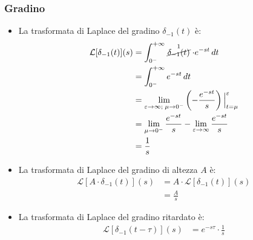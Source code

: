 \documentclass[a4paper]{article}
\begin{document}
\subsubsection{Gradino}

\begin{figure}[H]
  \centering
\end{figure}
\begin{itemize}
  \item 
    La trasformata di Laplace del gradino \( \delta_{-1}(t) \) è:
    \[
      \begin{aligned}
        \mathcal{L}[\delta_{-1}(t)](s) &= \int_{0^-}^{+\infty} \stackrel{1}{\cancel{\delta_{-1}(t)}} \cdot e^{-st} \, dt\\
                                       &= \int_{0^-}^{+\infty} e^{-st} \, dt\\
                                       &= \lim_{\varepsilon \to \infty;\; \mu \to 0^-} \left( - \frac{e^{-st}}{s} \right) \Big|^{\varepsilon}_{t=\mu}\\
                                       &= \lim_{\mu \to 0^-}  \frac{e^{-st}}{s} - \lim_{\varepsilon \to \infty} \frac{e^{-st}}{s}\\
                                       &= \frac{1}{s}
      \end{aligned}
    \] 

  \item 
    La trasformata di Laplace del gradino di altezza \( A \) è:
    \[
      \begin{aligned}
        \mathcal{L}[A \cdot \delta_{-1}(t)](s) &= A \cdot \mathcal{L}[\delta_{-1}(t)](s)\\
                                               &= \frac{A}{s}
      \end{aligned}
    \]
  \item 
    La trasformata di Laplace del gradino ritardato è:
    \[
      \begin{aligned}
        \mathcal{L}[\delta_{-1}(t - \tau)](s) &= e^{-s \tau} \cdot \frac{1}{s}
      \end{aligned}
    \]
\end{itemize}
\end{document}
